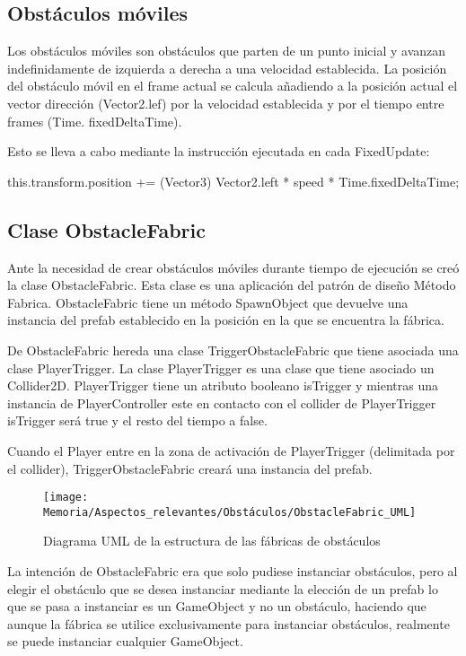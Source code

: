 \subsection{Obstáculos móviles}
Los obstáculos móviles son obstáculos que parten de un punto inicial y avanzan indefinidamente de izquierda a derecha a una velocidad establecida. La posición del obstáculo móvil en el frame actual se calcula añadiendo a la posición actual el vector dirección (Vector2.lef) por la velocidad establecida y por el tiempo entre frames (Time. fixedDeltaTime).

Esto se lleva a cabo mediante la instrucción ejecutada en cada FixedUpdate:

this.transform.position += (Vector3) Vector2.left * speed * Time.fixedDeltaTime;

\subsection{Clase ObstacleFabric}
Ante la necesidad de crear obstáculos móviles durante tiempo de ejecución se creó la clase ObstacleFabric. Esta clase es una aplicación del patrón de diseño Método Fabrica. ObstacleFabric tiene un método SpawnObject que devuelve una instancia del prefab establecido en la posición en la que se encuentra la fábrica.

De ObstacleFabric hereda una clase TriggerObstacleFabric que tiene asociada una clase PlayerTrigger. La clase PlayerTrigger es una clase que tiene asociado un Collider2D. PlayerTrigger tiene un atributo booleano isTrigger y mientras una instancia de PlayerController este en contacto con el collider de PlayerTrigger isTrigger será true y el resto del tiempo a false.

Cuando el Player entre en la zona de activación de PlayerTrigger (delimitada por el collider), TriggerObstacleFabric creará una instancia del prefab.

\begin{figure}[h]
\centering
\texttt{[image: Memoria/Aspectos\_relevantes/Obstáculos/ObstacleFabric\_UML]}
\caption{Diagrama UML de la estructura de las fábricas de obstáculos}
\end{figure}

La intención de ObstacleFabric era que solo pudiese instanciar obstáculos, pero al elegir el obstáculo que se desea instanciar mediante la elección de un prefab lo que se pasa a instanciar es un GameObject y no un obstáculo, haciendo que aunque la fábrica se utilice exclusivamente para instanciar obstáculos, realmente se puede instanciar cualquier GameObject.

